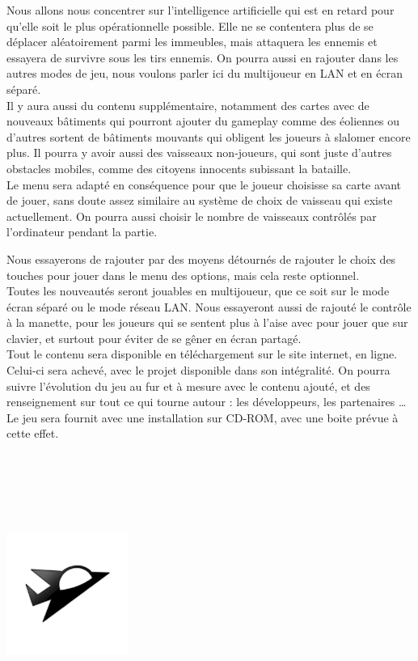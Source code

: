 \documentclass[10pt, titlepage]{report}
\begin{document}
 Nous allons nous concentrer sur l'intelligence artificielle qui est en retard pour qu'elle soit le plus opérationnelle possible. Elle ne se contentera plus de se déplacer aléatoirement parmi les immeubles, mais attaquera les ennemis et essayera de survivre sous les tirs ennemis. On pourra aussi en rajouter dans les autres modes de jeu, nous voulons parler ici du multijoueur en LAN et en écran séparé.\\

Il y aura aussi du contenu supplémentaire, notamment des cartes avec de nouveaux bâtiments qui pourront ajouter du gameplay comme des éoliennes ou d'autres sortent de bâtiments mouvants qui obligent les joueurs à slalomer encore plus. Il pourra y avoir aussi des vaisseaux non-joueurs, qui sont juste d'autres obstacles mobiles, comme des citoyens innocents subissant la bataille.\\

Le menu sera adapté en conséquence pour que le joueur choisisse sa carte avant de jouer, sans doute assez similaire au système de choix de vaisseau qui existe actuellement. On pourra aussi choisir le nombre de vaisseaux contrôlés par l'ordinateur pendant la partie.

Nous essayerons de rajouter par des moyens détournés de rajouter le choix des touches pour jouer dans le menu des options, mais cela reste optionnel.\\

Toutes les nouveautés seront jouables en multijoueur, que ce soit sur le mode écran séparé ou le mode réseau LAN. Nous essayeront aussi de rajouté le contrôle à la manette, pour les joueurs qui se sentent plus à l'aise avec pour jouer que sur clavier, et surtout pour éviter de se gêner en écran partagé.\\

Tout le contenu sera disponible en téléchargement sur le site internet, en ligne. Celui-ci sera achevé, avec le projet disponible dans son intégralité. On pourra suivre l'évolution du jeu au fur et à mesure avec le contenu ajouté, et des renseignement sur tout ce qui tourne autour : les développeurs, les partenaires \dots \\

Le jeu sera fournit avec une installation sur CD-ROM, avec une boite prévue à cette effet. \\ \\ \\ \\ \\ \\

\begin{center}
\includegraphics[height=4cm, width=4cm]{vaisseux_petit.png}
\end{center}
\end{document}
